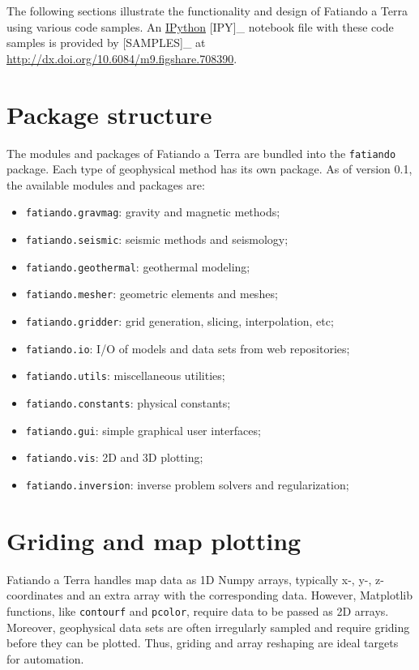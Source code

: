 The following sections illustrate the functionality and design of
Fatiando a Terra using various code samples. An
\href{http://ipython.org/}{IPython} {[}IPY{]}\_ notebook file with these
code samples is provided by {[}SAMPLES{]}\_ at
\url{http://dx.doi.org/10.6084/m9.figshare.708390}.

\section{Package structure}

The modules and packages of Fatiando a Terra are bundled into the
\texttt{fatiando} package. Each type of geophysical method has its own
package. As of version 0.1, the available modules and packages are:

\begin{itemize}
\item
  \texttt{fatiando.gravmag}: gravity and magnetic methods;
\item
  \texttt{fatiando.seismic}: seismic methods and seismology;
\item
  \texttt{fatiando.geothermal}: geothermal modeling;
\item
  \texttt{fatiando.mesher}: geometric elements and meshes;
\item
  \texttt{fatiando.gridder}: grid generation, slicing, interpolation,
  etc;
\item
  \texttt{fatiando.io}: I/O of models and data sets from web
  repositories;
\item
  \texttt{fatiando.utils}: miscellaneous utilities;
\item
  \texttt{fatiando.constants}: physical constants;
\item
  \texttt{fatiando.gui}: simple graphical user interfaces;
\item
  \texttt{fatiando.vis}: 2D and 3D plotting;
\item
  \texttt{fatiando.inversion}: inverse problem solvers and
  regularization;
\end{itemize}

\section{Griding and map plotting}

Fatiando a Terra handles map data as 1D Numpy arrays, typically x-, y-,
z-coordinates and an extra array with the corresponding data. However,
Matplotlib functions, like \texttt{contourf} and \texttt{pcolor},
require data to be passed as 2D arrays. Moreover, geophysical data sets
are often irregularly sampled and require griding before they can be
plotted. Thus, griding and array reshaping are ideal targets for
automation.

